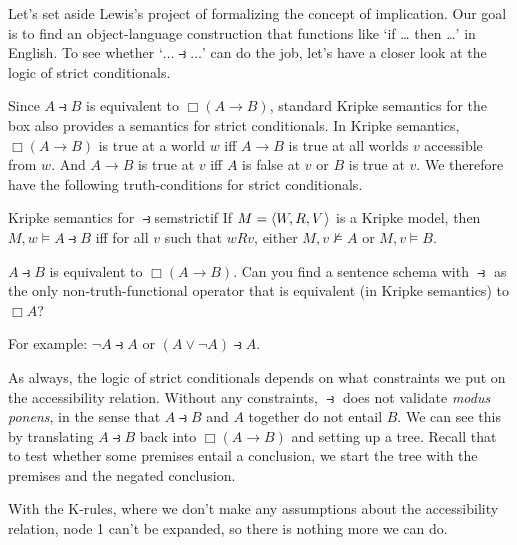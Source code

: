 Let's set aside Lewis's project of formalizing the concept of implication. Our
goal is to find an object-language construction that functions like `if \ldots
then \ldots' in English. To see whether `$\ldots \strictif\ldots$' can do the job,
let's have a closer look at the logic of strict conditionals.

Since $A \strictif B$ is equivalent to $\Box(A \to B)$, standard Kripke
semantics for the box also provides a semantics for strict conditionals. In
Kripke semantics, $\Box(A \to B)$ is true at a world $w$ iff $A \to B$ is true
at all worlds $v$ accessible from $w$. And $A \to B$ is true at $v$ iff 
$A$ is false at $v$ or $B$ is true at $v$. We therefore have the following
truth-conditions for strict conditionals.

\begin{definition}{Kripke semantics for $\strictif$}{semstrictif}
  If $M = \t{W,R,V}$ is a Kripke model, then\\[1mm]
  $M,w \models A \strictif B$ iff for all $v$ such that $wRv$, either
  $M,v \not\models A$ or $M,v \models B$.
\end{definition}

\begin{exercise}
  $A \strictif B$ is equivalent to $\Box(A \to B)$. Can you find a sentence
  schema with $\strictif$ as the only non-truth-functional operator that is
  equivalent (in Kripke semantics) to $\Box A$?
\end{exercise}
\begin{solution}
  For example: $\neg A \strictif A$ or $(A\lor \neg A) \strictif A$.
\end{solution}

As always, the logic of strict conditionals depends on what constraints we
put on the accessibility relation. Without any constraints, $\strictif$ does
not validate \emph{modus ponens}, in the sense that $A \strictif B$ and $A$
together do not entail $B$. We can see this by translating
$A \strictif B$ back into $\Box(A \to B)$ and setting up a tree. Recall that to
test whether some premises entail a conclusion, we start the tree with the
premises and the negated conclusion.
%
\begin{center}
\end{center}
%
With the K-rules, where we don't make any assumptions about the accessibility
relation, node 1 can't be expanded, so there is nothing more we can do.

